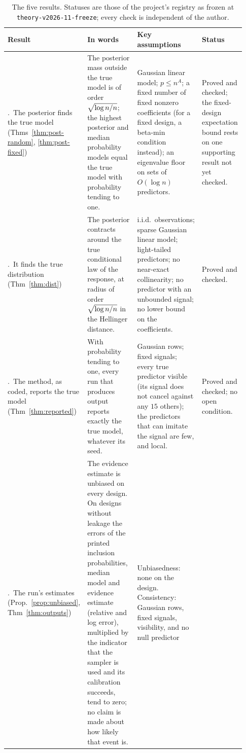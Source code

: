 \begin{table}[ht]
\centering\footnotesize
\setlength{\tabcolsep}{3.5pt}
\renewcommand{\arraystretch}{1.12}
\caption{The five results. Statuses are those of the project's registry as frozen at \texttt{theory-v2026-11-freeze};
every check is independent of the author.}\label{tab:results}
\begin{tabular}{@{}>{\raggedright\arraybackslash}p{0.17\linewidth}>{\raggedright\arraybackslash}p{0.3\linewidth}>{\raggedright\arraybackslash}p{0.26\linewidth}>{\raggedright\arraybackslash}p{0.2\linewidth}@{}}
\toprule
Result & In words & Key assumptions & Status \\
\midrule
1.~The posterior finds the true model (Thms~\ref{thm:post-random}, \ref{thm:post-fixed}) &
The posterior mass outside the true model is of order $\sqrt{\log n/n}$; the highest posterior and median probability models equal
the true model with probability tending to one. &
Gaussian linear model; $p\le n^A$; a fixed number of fixed nonzero coefficients (for a fixed design, a beta-min
condition instead); an eigenvalue floor on sets of $O(\log n)$ predictors. &
Proved and checked; the fixed-design expectation bound rests on one supporting result not yet checked. \\
2.~It finds the true distribution (Thm~\ref{thm:dist}) &
The posterior contracts around the true conditional law of the response, at radius of order $\sqrt{\log n/n}$ in the Hellinger distance. &
i.i.d.\ observations; sparse Gaussian linear model; light-tailed predictors; no near-exact collinearity; no predictor with an unbounded
signal; no lower bound on the coefficients. &
Proved and checked. \\
3.~The method, as coded, reports the true model (Thm~\ref{thm:reported}) &
With probability tending to one, every run that produces output reports exactly the true model, whatever its seed. &
Gaussian rows; fixed signals; every true predictor visible (its signal does not cancel against any $15$ others); the predictors that can imitate the signal are few,
and local. &
Proved and checked; no open condition. \\
4.~The run's estimates (Prop.~\ref{prop:unbiased}, Thm~\ref{thm:outputs}) &
The evidence estimate is unbiased on every design. On designs without leakage the errors of the printed inclusion
probabilities, median model and evidence estimate (relative and log error), multiplied by the indicator that the sampler
is used and its calibration succeeds, tend to zero; no claim is made about how likely that event is. &
Unbiasedness: none on the design. Consistency: Gaussian rows, fixed signals, visibility, and no null predictor

\end{tabular}
\end{table}
